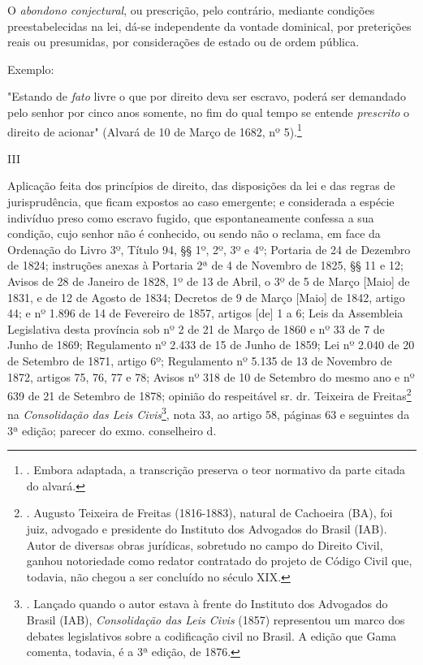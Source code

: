 O \emph{abondono conjectural}, ou prescrição, pelo contrário, mediante
condições preestabelecidas na lei, dá-se independente da vontade
dominical, por preterições reais ou presumidas, por considerações de
estado ou de ordem pública.

Exemplo:

"Estando de \emph{fato} livre o que por direito deva ser escravo, poderá
ser demandado pelo senhor por cinco anos somente, no fim do qual tempo
se entende \emph{prescrito} o direito de acionar" (Alvará de 10 de Março
de 1682, nº 5).\footnote{. Embora adaptada, a transcrição preserva o
  teor normativo da parte citada do alvará.}

III

Aplicação feita dos princípios de direito, das disposições da lei e das
regras de jurisprudência, que ficam expostos ao caso emergente; e
considerada a espécie indivíduo preso como escravo fugido, que
espontaneamente confessa a sua condição, cujo senhor não é conhecido, ou
sendo não o reclama, em face da Ordenação do Livro 3º, Título 94, §§ 1º,
2º, 3º e 4º; Portaria de 24 de Dezembro de 1824; instruções anexas à
Portaria 2ª de 4 de Novembro de 1825, §§ 11 e 12; Avisos de 28 de
Janeiro de 1828, 1º de 13 de Abril, o 3º de 5 de Março {[}Maio{]} de
1831, e de 12 de Agosto de 1834; Decretos de 9 de Março {[}Maio{]} de
1842, artigo 44; e nº 1.896 de 14 de Fevereiro de 1857, artigos {[}de{]}
1 a 6; Leis da Assembleia Legislativa desta província sob nº 2 de 21 de
Março de 1860 e nº 33 de 7 de Junho de 1869; Regulamento nº 2.433 de 15
de Junho de 1859; Lei nº 2.040 de 20 de Setembro de 1871, artigo 6º;
Regulamento nº 5.135 de 13 de Novembro de 1872, artigos 75, 76, 77 e 78;
Avisos nº 318 de 10 de Setembro do mesmo ano e nº 639 de 21 de Setembro
de 1878; opinião do respeitável sr. dr. Teixeira de Freitas\footnote{.
  Augusto Teixeira de Freitas (1816-1883), natural de Cachoeira (BA),
  foi juiz, advogado e presidente do Instituto dos Advogados do Brasil
  (IAB). Autor de diversas obras jurídicas, sobretudo no campo do
  Direito Civil, ganhou notoriedade como redator contratado do projeto
  de Código Civil que, todavia, não chegou a ser concluído no século
  XIX.} na \emph{Consolidação das Leis Civis}\footnote{. Lançado quando
  o autor estava à frente do Instituto dos Advogados do Brasil (IAB),
  \emph{Consolidação das Leis Civis} (1857) representou um marco dos
  debates legislativos sobre a codificação civil no Brasil. A edição que
  Gama comenta, todavia, é a 3ª edição, de 1876.}, nota 33, ao artigo
58, páginas 63 e seguintes da 3ª edição; parecer do exmo. conselheiro d.
